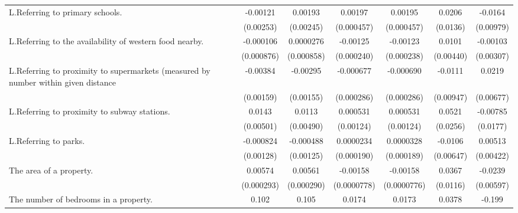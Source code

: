 {\begin{tabular}{l*{6}{c}}
\addlinespace
L.Referring to primary schools.&    -0.00121         &     0.00193         &     0.00197\sym{***}&     0.00195\sym{***}&      0.0206         &     -0.0164\sym{*}  \\
                    &   (0.00253)         &   (0.00245)         &  (0.000457)         &  (0.000457)         &    (0.0136)         &   (0.00979)         \\
\addlinespace
L.Referring to the availability of western food nearby.&   -0.000106         &   0.0000276         &    -0.00125\sym{***}&    -0.00123\sym{***}&      0.0101\sym{**} &    -0.00103         \\
                    &  (0.000876)         &  (0.000858)         &  (0.000240)         &  (0.000238)         &   (0.00440)         &   (0.00307)         \\
\addlinespace
L.Referring to proximity to supermarkets (measured by number within given distance&    -0.00384\sym{**} &    -0.00295\sym{*}  &   -0.000677\sym{**} &   -0.000690\sym{**} &     -0.0111         &      0.0219\sym{***}\\
                    &   (0.00159)         &   (0.00155)         &  (0.000286)         &  (0.000286)         &   (0.00947)         &   (0.00677)         \\
\addlinespace
L.Referring to proximity to subway stations.&      0.0143\sym{***}&      0.0113\sym{**} &    0.000531         &    0.000531         &      0.0521\sym{**} &    -0.00785         \\
                    &   (0.00501)         &   (0.00490)         &   (0.00124)         &   (0.00124)         &    (0.0256)         &    (0.0177)         \\
\addlinespace
L.Referring to parks.&   -0.000824         &   -0.000488         &   0.0000234         &   0.0000328         &     -0.0106         &     0.00513         \\
                    &   (0.00128)         &   (0.00125)         &  (0.000190)         &  (0.000189)         &   (0.00647)         &   (0.00422)         \\
\addlinespace
The area of a property.&     0.00574\sym{***}&     0.00561\sym{***}&    -0.00158\sym{***}&    -0.00158\sym{***}&      0.0367\sym{***}&     -0.0239\sym{***}\\
                    &  (0.000293)         &  (0.000290)         & (0.0000778)         & (0.0000776)         &    (0.0116)         &   (0.00597)         \\
\addlinespace
The number of bedrooms in a property.&       0.102\sym{***}&       0.105\sym{***}&      0.0174\sym{***}&      0.0173\sym{***}&      0.0378         &      -0.199\sym{***}\\

\end{tabular}}

